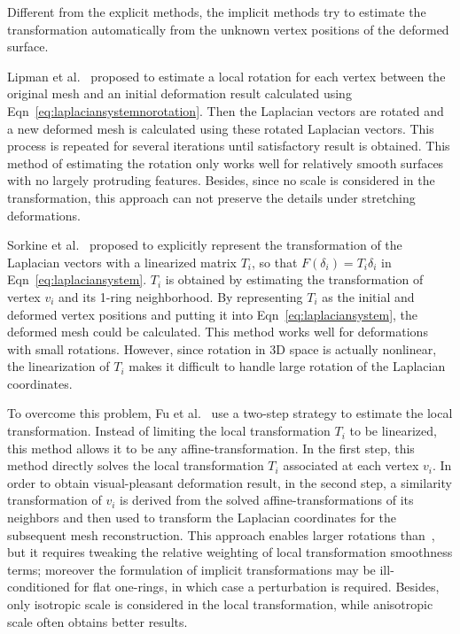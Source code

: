 Different from the explicit methods, the implicit methods try to estimate the transformation automatically from the unknown vertex positions of the deformed surface.

Lipman et al.~\cite{LSCLRS04} proposed to estimate a local rotation for each vertex between the original mesh and an initial deformation result calculated using Eqn~\ref{eq:laplaciansystemnorotation}. Then the Laplacian vectors are rotated and a new deformed mesh is calculated using these rotated Laplacian vectors. This process is repeated for several iterations until satisfactory result is obtained. This method of estimating the rotation only works well for relatively smooth surfaces with no largely protruding features. Besides, since no scale is considered in the transformation, this approach can not preserve the details under stretching deformations.

Sorkine et al.~\cite{SCLARS04} proposed to explicitly represent the transformation of the Laplacian vectors with a linearized matrix $T_i$, so that $F(\delta_i)=T_i\delta_i$ in Eqn~\ref{eq:laplaciansystem}.
$T_i$ is obtained by estimating the transformation of vertex $v_i$ and its 1-ring neighborhood. By representing $T_i$ as the initial and deformed vertex positions and putting it into Eqn~\ref{eq:laplaciansystem}, the deformed mesh could be calculated. This method works well for deformations with small rotations. However, since rotation in 3D space is actually nonlinear, the linearization of $T_i$ makes it difficult to handle large rotation of the Laplacian coordinates.

To overcome this problem, Fu et al.~\cite{FAT07} use a two-step strategy to estimate the local transformation. Instead of limiting the local transformation $T_i$ to be linearized, this method allows it to be any affine-transformation. In the first step, this method directly solves the local transformation $T_i$ associated at each vertex $v_i$. In order to obtain visual-pleasant deformation result, in the second step, a similarity transformation of $v_i$ is derived from the solved affine-transformations of its neighbors and then used to transform the Laplacian coordinates for the subsequent mesh reconstruction. This approach enables larger rotations than~\cite{SCLARS04}, but it requires tweaking the relative weighting of local transformation smoothness terms; moreover the formulation of implicit transformations may be ill-conditioned for flat one-rings, in which case a perturbation is required. Besides, only isotropic scale is considered in the local transformation, while anisotropic scale often obtains better results.

